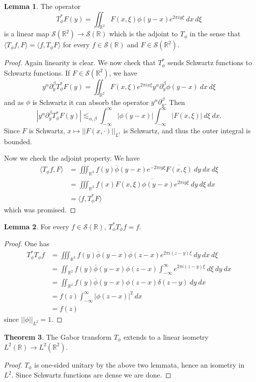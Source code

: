 \documentclass[12pt]{report}
\newcommand{\RR}{\mathbb{R}}
\newcommand{\Sch}{\mathcal{S}}
\theoremstyle{definition}
\newtheorem{theorem}{Theorem}[chapter]
\newtheorem{lemma}[theorem]{Lemma}
\begin{document}
\begin{lemma}
The operator
$$T_\phi^*F(y) = \iint_{\RR^2} F(x, \xi)\phi(y - x)e^{2\pi iy\xi}~dx~d\xi$$
is a linear map $\Sch(\RR^2) \to \Sch(\RR)$ which is the adjoint to $T_\phi$ in the sense that $\langle T_\phi f, F\rangle = \langle f, T_\phi F\rangle$ for every $f \in \Sch(\RR)$ and $F \in \Sch(\RR^2)$.
\end{lemma}
\begin{proof}
Again linearity is clear. We now check that $T_\phi^*$ sends Schwartz functions to Schwartz functions. If $F \in \Sch(\RR^2)$, we have
$$y^\alpha \partial_y^\beta T_\phi^* F(y) = \iint_{\RR^2} F(x, \xi) e^{2\pi ix\xi} y^\alpha \partial_y^\beta \phi(y - x) ~dx ~d\xi$$
and as $\phi$ is Schwartz it can absorb the operator $y^\alpha \partial_y^\beta$. Then
$$|y^\alpha \partial_y^\beta T_\phi^* F(y)| \lesssim_{\alpha, \beta} \int_{-\infty}^\infty |\phi(y - x)| \int_{-\infty}^\infty |F(x, \xi)| ~d\xi ~dx.$$
Since $F$ is Schwartz, $x \mapsto ||F(x, \cdot)||_{L^1}$ is Schwartz, and thus the outer integral is bounded.

Now we check the adjoint property. We have
\begin{align*}\langle T_\phi f, F\rangle &= \iiint_{\RR^3} f(y) \overline \phi(y - x) e^{-2\pi iy\xi} \overline{F(x, \xi)} ~dy ~dx ~d\xi\\
&= \iiint_{\RR^3} f(x) \overline{F(x, \xi) \phi(y - x) e^{2\pi iy\xi}} ~dy ~d\xi ~dx\\
&= \langle f, T_\phi^*F\rangle
\end{align*}
which was promised.
\end{proof}
\begin{lemma}
For every $f \in \Sch(\RR)$, $T_\phi^* T_\phi f = f$.
\end{lemma}
\begin{proof}
One has
\begin{align*}
T_\phi^* T_\phi f &= \iiint_{\RR^3} f(y) \overline \phi(y - x) \phi(z - x) e^{2\pi i(z - y)\xi} ~dy ~dx ~d\xi\\
&= \iint_{\RR^2} f(y) \overline \phi(y - x) \phi(z - x) \int_{-\infty}^\infty e^{2\pi i(z - y)\xi} ~d\xi ~dy ~dx\\
&= \iint_{\RR^2} f(y) \overline \phi(y - x) \phi(z - x) \delta(z - y) ~dy ~dx\\
&= f(z) \int_{-\infty}^\infty |\phi(z - x)|^2 ~dx\\
&= f(z)
\end{align*}
since $||\phi||_{L^2} = 1$.
\end{proof}
\begin{theorem}
The Gabor transform $T_\phi$ extends to a linear isometry $L^2(\RR) \to L^2(\RR^2)$.
\end{theorem}
\begin{proof}
$T_\phi$ is one-sided unitary by the above two lemmata, hence an isometry in $L^2$. Since Schwartz functions are dense we are done.
\end{proof}
\end{document}
